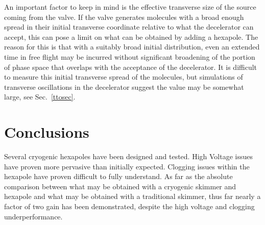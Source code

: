 An important factor to keep in mind is the effective transverse size of the source coming from the valve.
If the valve generates molecules with a broad enough spread in their initial transverse coordinate relative to what the decelerator can accept, this can pose a limit on what can be obtained by adding a hexapole.
The reason for this is that with a suitably broad initial distribution, even an extended time in free flight may be incurred without significant broadening of the portion of phase space that overlaps with the acceptance of the decelerator.
It is difficult to measure this initial transverse spread of the molecules, but simulations of transverse oscillations in the decelerator suggest the value may be somewhat large, see Sec.~\ref{ttosec}.

\section{Conclusions}

Several cryogenic hexapoles have been designed and tested.
High Voltage issues have proven more pervasive than initially expected.
Clogging issues within the hexapole have proven difficult to fully understand.
As far as the absolute comparison between what may be obtained with a cryogenic skimmer and hexapole and what may be obtained with a traditional skimmer, thus far nearly a factor of two gain has been demonstrated, despite the high voltage and clogging underperformance.












\ifx\justbeingincluded\undefined

\fi
